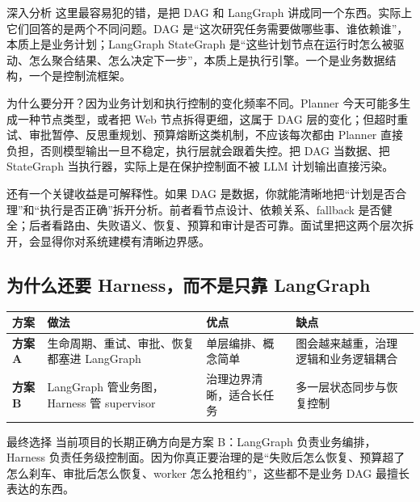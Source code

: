 \documentclass[12pt]{article}
\begin{document}
\begin{analysisBox}{深入分析}
这里最容易犯的错，是把 DAG 和 LangGraph 讲成同一个东西。实际上它们回答的是两个不同问题。DAG 是“这次研究任务需要做哪些事、谁依赖谁”，本质上是业务计划；LangGraph StateGraph 是“这些计划节点在运行时怎么被驱动、怎么聚合结果、怎么决定下一步”，本质上是执行引擎。一个是业务数据结构，一个是控制流框架。

为什么要分开？因为业务计划和执行控制的变化频率不同。Planner 今天可能多生成一种节点类型，或者把 Web 节点拆得更细，这属于 DAG 层的变化；但超时重试、审批暂停、反思重规划、预算熔断这类机制，不应该每次都由 Planner 直接负担，否则模型输出一旦不稳定，执行层就会跟着失控。把 DAG 当数据、把 StateGraph 当执行器，实际上是在保护控制面不被 LLM 计划输出直接污染。

还有一个关键收益是可解释性。如果 DAG 是数据，你就能清晰地把“计划是否合理”和“执行是否正确”拆开分析。前者看节点设计、依赖关系、fallback 是否健全；后者看路由、失败语义、恢复、预算和审计是否可靠。面试里把这两个层次拆开，会显得你对系统建模有清晰边界感。
\end{analysisBox}

\subsection{为什么还要 Harness，而不是只靠 LangGraph}
\begin{center}
\small
\begin{tabularx}{\textwidth}{>{\bfseries}lXXX}
\toprule
方案 & 做法 & 优点 & 缺点 \\
\midrule
方案 A & 生命周期、重试、审批、恢复都塞进 LangGraph & 单层编排、概念简单 & 图会越来越重，治理逻辑和业务逻辑耦合 \\
方案 B & LangGraph 管业务图，Harness 管 supervisor & 治理边界清晰，适合长任务 & 多一层状态同步与恢复控制 \\
\bottomrule
\end{tabularx}
\end{center}

\begin{qaBox}{最终选择}
当前项目的长期正确方向是方案 B：LangGraph 负责业务编排，Harness 负责任务级控制面。因为你真正要治理的是“失败后怎么恢复、预算超了怎么刹车、审批后怎么恢复、worker 怎么抢租约”，这些都不是业务 DAG 最擅长表达的东西。
\end{qaBox}
\end{document}
